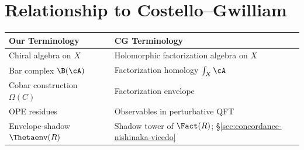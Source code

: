 \section{Relationship to Costello--Gwilliam}

\begin{tabular}{>{\raggedright\arraybackslash}p{}>{\raggedright\arraybackslash}p{}}
\textbf{Our Terminology} & \textbf{CG Terminology} \\
\hline
Chiral algebra on $X$ & Holomorphic factorization algebra on $X$ \\
Bar complex $\B(\cA)$ & Factorization homology $\int_X \cA$ \\
Cobar construction $\Omega(C)$ & Factorization envelope \\
OPE residues & Observables in perturbative QFT \\
Envelope-shadow $\Thetaenv(R)$ & Shadow tower of $\Fact(R)$; \S\ref{sec:concordance-nishinaka-vicedo} \\
\end{tabular}

